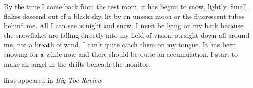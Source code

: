 By the time I come back from the rest room, it has begun to snow,
lightly. Small flakes descend out of a black sky, lit by an unseen moon
or the fluorescent tubes behind me. All I can see is night and snow. I
must be lying on my back because the snowflakes are falling directly
into my field of vision, straight down all around me, not a breath of
wind. I can't quite catch them on my tongue. It has been snowing for a
while now and there should be quite an accumulation. I start to make an
angel in the drifts beneath the monitor.

first appeared in \emph{Big Toe Review}
